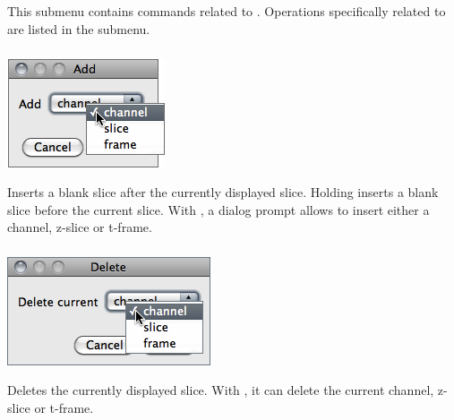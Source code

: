 \subsection{\protect{}\label{sub:Stacks}}

This submenu contains commands related to .
Operations specifically related to 
are listed in the 
submenu.


\subsubsection[\protect\userinterface{Add Slice}]{\protect{}\label{sub:Add-Slice}\improvement{}}

\begin{minipage}[c][1\totalheight][t]{0.275\columnwidth}%
\includegraphics[scale=0.55]{images/AddSlice}%
\end{minipage}%
\begin{minipage}[c][1\totalheight][t]{0.725\columnwidth}%
Inserts a blank slice after the currently displayed slice. Holding
 inserts a blank slice before the current slice.
With , a dialog prompt allows to insert
either a channel, z-slice or t-frame.


%
\end{minipage}


\subsubsection[\protect\userinterface{Delete Slice}]{\protect{}\label{sub:Delete-Slice}\improvement{}}

\begin{minipage}[c][1\totalheight][t]{0.337\columnwidth}%
\includegraphics[scale=0.55]{images/DeleteSlice}%
\end{minipage}%
\begin{minipage}[c][1\totalheight][t]{0.663\columnwidth}%
Deletes the currently displayed slice. With ,
it can delete the current channel, z-slice or t-frame.


%
\end{minipage}


